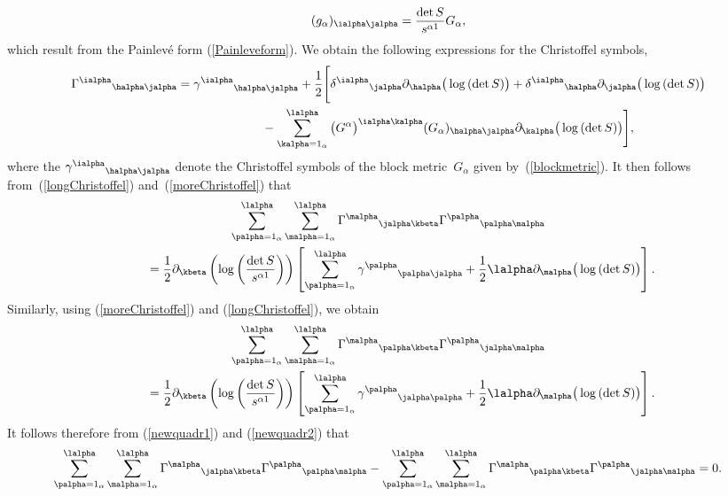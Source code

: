 \[
(g_{\alpha})_{\ialpha \jalpha}=\frac{\det S}{s^{\alpha 1}}G_{\alpha},
\]
which result from the Painlev\'e form (\ref{Painleveform}). We obtain the following expressions for the Christoffel symbols,
\begin{gather}
{\Gamma^{\ialpha}}_{\halpha \jalpha}={\gamma^{\ialpha}}_{\halpha \jalpha} +\frac{1}{2}\Bigg[ {\delta^{\ialpha}}_{\jalpha}\partial_{\halpha}\big(\log{(\det S)}\big)+{\delta^{\ialpha}}_{\halpha}\partial_{\jalpha}\big(\log{(\det S)}\big)\nonumber\\
\hphantom{{\Gamma^{\ialpha}}_{\halpha \jalpha}=}{}-\sum_{\kalpha = 1_{\alpha}}^{\lalpha}\big(G^{\alpha}\big)^{\ialpha \kalpha}(G_{\alpha})_{\halpha \jalpha}\partial_{\kalpha}\big(\log{(\det S)}\big)\Bigg],\label{longChristoffel}
\end{gather}
where the ${\gamma^{\ialpha}}_{\halpha \jalpha}$ denote the Christoffel symbols of the block metric~$G_{\alpha}$ given by~(\ref{blockmetric}). It then follows from~(\ref{longChristoffel}) and~(\ref{moreChristoffel}) that
\begin{gather}
\sum_{\palpha=1_{\alpha}}^{\lalpha}\sum_{\malpha = 1_{\alpha}}^{\lalpha}{\Gamma^{\malpha}}_{\jalpha \kbeta}{\Gamma^{\palpha}}_{\palpha \malpha}\nonumber\\
\qquad{} =\frac{1}{2}\partial_{\kbeta}\left(\log\left(\frac{\det S}{s^{\alpha 1}}\right)\right)\left[\sum_{\palpha=1_{\alpha}}^{\lalpha}{\gamma^{\palpha}}_{\palpha \jalpha}+\frac{1}{2}\lalpha \partial_{\malpha}\big(\log{(\det S)}\big)\right].\label{newquadr1}
\end{gather}
Similarly, using (\ref{moreChristoffel}) and (\ref{longChristoffel}), we obtain
\begin{gather}
\sum_{\palpha=1_{\alpha}}^{\lalpha}\sum_{\malpha=1_{\alpha}}^{\lalpha}{\Gamma^{\malpha}}_{\palpha \kbeta}{\Gamma^{\palpha}}_{\jalpha \malpha}\nonumber\\
\qquad{} =\frac{1}{2}\partial_{\kbeta}\left(\log\left(\frac{\det S}{s^{\alpha 1}}\right)\right)\left[\sum_{\palpha=1_{\alpha}}^{\lalpha}{\gamma^{\palpha}}_{\jalpha \palpha}+\frac{1}{2}\lalpha \partial_{\malpha}\big(\log{(\det S)}\big)\right].\label{newquadr2}
\end{gather}
It follows therefore from (\ref{newquadr1}) and (\ref{newquadr2}) that
\[
\sum_{\palpha=1_{\alpha}}^{\lalpha}\sum_{\malpha = 1_{\alpha}}^{\lalpha}{\Gamma^{\malpha}}_{\jalpha \kbeta}{\Gamma^{\palpha}}_{\palpha \malpha}-\sum_{\palpha=1_{\alpha}}^{\lalpha}\sum_{\malpha=1_{\alpha}}^{\lalpha}{\Gamma^{\malpha}}_{\palpha \kbeta}{\Gamma^{\palpha}}_{\jalpha \malpha}=0.
\]
